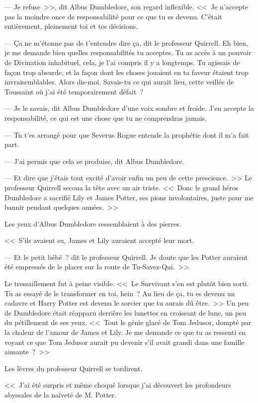 --- Je refuse~>>, dit Albus Dumbledore, son regard inflexible. <<~Je n'accepte pas la moindre once de responsabilité pour ce que tu es devenu. C'était entièrement, pleinement toi et tes décisions.

--- Ça ne m'étonne pas de t'entendre dire ça, dit le professeur Quirrell. Eh bien, je me demande bien quelles responsabilités tu acceptes. Tu as accès à un pouvoir de Divination inhabituel, cela, je l'ai compris il y a longtemps. Tu agissais de façon trop absurde, et la façon dont les choses jouaient en ta faveur étaient trop invraisemblables. Alors dis-moi. Savais-tu ce qui aurait lieu, cette veillée de Toussaint où j'ai été temporairement défait~?

--- Je le savais, dit Albus Dumbledore d'une voix sombre et froide. J'en accepte la responsabilité, ce qui est une chose que tu ne comprendras jamais.

--- Tu t'es arrangé pour que Severus Rogue entende la prophétie dont il m'a fait part.

--- J'ai permis que cela se produise, dit Albus Dumbledore.

--- Et dire que j'étais tout excité d'avoir enfin un peu de cette prescience.~>> Le professeur Quirrell secoua la tête avec un air triste. <<~Donc le grand héros Dumbledore a sacrifié Lily et James Potter, ses pions involontaires, juste pour me bannir pendant quelques années.~>>

Les yeux d'Albus Dumbledore ressemblaient à des pierres.

<<~S'ils avaient su, James et Lily auraient accepté leur mort.

--- Et le petit bébé~? dit le professeur Quirrell. Je doute que les Potter auraient été empressés de le placer sur la route de Tu-Savez-Qui.~>>

Le tressaillement fut à peine visible. <<~Le Survivant s'en est plutôt bien sorti. Tu as essayé de le transformer en toi, hein~? Au lieu de ça, tu es devenu un cadavre et Harry Potter est devenu le sorcier que tu aurais dû être.~>> Un peu de Dumbledore était réapparu derrière les lunettes en croissant de lune, un peu du pétillement de ses yeux. <<~Tout le génie glacé de Tom Jedusor, dompté par la chaleur de l'amour de James et Lily. Je me demande ce que tu as ressenti en voyant ce que Tom Jedusor aurait pu devenir s'il avait grandi dans une famille aimante~?~>>

Les lèvres du professeur Quirrell se tordirent.

<<~J'ai été surpris et même choqué lorsque j'ai découvert les profondeurs abyssales de la naïveté de M. Potter.

